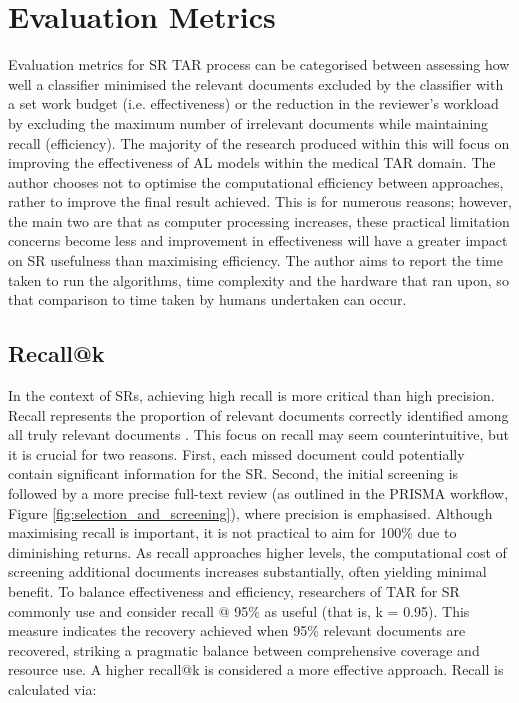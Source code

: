 \documentclass[10pt, english]{article}
\begin{document}
\section{Evaluation Metrics}
Evaluation metrics for SR TAR process can be categorised between assessing how well a classifier minimised the relevant documents excluded by the classifier with a set work budget (i.e. effectiveness) or the reduction in the reviewer's workload by excluding the maximum number of irrelevant documents while maintaining recall (efficiency).  The majority of the research produced within this will focus on improving the effectiveness of AL models within the medical TAR domain. The author chooses not to optimise the computational efficiency between approaches, rather to improve the final result achieved. This is for numerous reasons; however, the main two are that as computer processing increases, these practical limitation concerns become less and improvement in effectiveness will have a greater impact on SR usefulness than maximising efficiency.  The author aims to report the time taken to run the algorithms, time complexity and the hardware that ran upon, so that comparison to time taken by humans undertaken can occur.

\subsection{Recall@k}
In the context of SRs, achieving high recall is more critical than high precision. Recall represents the proportion of relevant documents correctly identified among all truly relevant documents \cite{omara-eves_using_2015}. This focus on recall may seem counterintuitive, but it is crucial for two reasons. First, each missed document could potentially contain significant information for the SR. Second, the initial screening is followed by a more precise full-text review (as outlined in the PRISMA workflow, Figure \ref{fig:selection_and_screening}), where precision is emphasised.
Although maximising recall is important, it is not practical to aim for 100\% due to diminishing returns. As recall approaches higher levels, the computational cost of screening additional documents increases substantially, often yielding minimal benefit. To balance effectiveness and efficiency, researchers of TAR for SR commonly use and consider recall @ 95\% as useful (that is, k = 0.95). This measure indicates the recovery achieved when 95\% relevant documents are recovered, striking a pragmatic balance between comprehensive coverage and resource use. A higher recall@k is considered a more effective approach.
Recall is calculated via:
\end{document}
